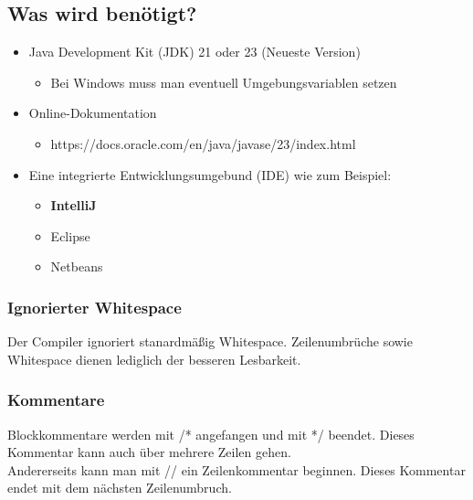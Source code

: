 \documentclass{article}
\begin{document}
	\subsection{Was wird benötigt?}
	\begin{itemize}
		\item{Java Development Kit (JDK) 21 oder 23 (Neueste Version)}
		\begin{itemize}
			\item{Bei Windows muss man eventuell Umgebungsvariablen setzen}
		\end{itemize}
		\item{Online-Dokumentation}
		\begin{itemize}
			\item{https://docs.oracle.com/en/java/javase/23/index.html}
		\end{itemize}
		\item{Eine integrierte Entwicklungsumgebund (IDE) wie zum Beispiel:}
		\begin{itemize}
			\item{\textbf{IntelliJ}}
			\item{Eclipse}
			\item{Netbeans}
		\end{itemize}
	\end{itemize}
	\subsubsection{Ignorierter Whitespace}
	Der Compiler ignoriert stanardmäßig Whitespace. Zeilenumbrüche sowie Whitespace dienen lediglich der besseren Lesbarkeit.
	\subsubsection{Kommentare}
	Blockkommentare werden mit /* angefangen und mit */ beendet. Dieses Kommentar kann auch über mehrere Zeilen gehen. \\
	Andererseits kann man mit // ein Zeilenkommentar beginnen. Dieses Kommentar endet mit dem nächsten Zeilenumbruch. \\
\end{document}
